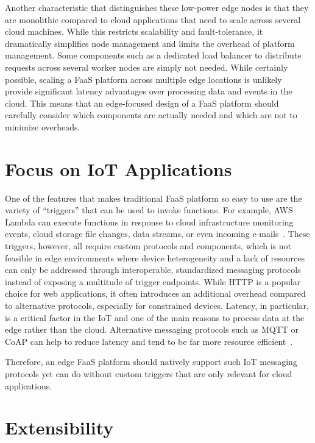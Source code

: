 Another characteristic that distinguishes these low-power edge nodes is that they are monolithic compared to cloud applications that need to scale across several cloud machines.
While this restricts scalability and fault-tolerance, it dramatically simplifies node management and limits the overhead of platform management.
Some components such as a dedicated load balancer to distribute requests across several worker nodes are simply not needed.
While certainly possible, scaling a FaaS platform across multiple edge locations is unlikely provide significant latency advantages over processing data and events in the cloud.
This means that an edge-focused design of a FaaS platform should carefully consider which components are actually needed and which are not to minimize overheads.

\section{Focus on IoT Applications}
\label{sec:focus_on_iot}

One of the features that makes traditional FaaS platform so easy to use are the variety of ``triggers'' that can be used to invoke functions.
For example, AWS Lambda can execute functions in response to cloud infrastructure monitoring events, cloud storage file changes, data streams, or even incoming e-mails~\cite{Baldini2017-zf}.
These triggers, however, all require custom protocols and components, which is not feasible in edge environments where device heterogeneity and a lack of resources can only be addressed through interoperable, standardized messaging protocols instead of exposing a multitude of trigger endpoints.
While HTTP is a popular choice for web applications, it often introduces an additional overhead compared to alternative protocols, especially for constrained devices.
Latency, in particular, is a critical factor in the IoT and one of the main reasons to process data at the edge rather than the cloud.
Alternative messaging protocols such as MQTT or CoAP can help to reduce latency and tend to be far more resource efficient~\cite{Laaroussi2018-fk,Naik2017-cn}.

Therefore, an edge FaaS platform should natively support such IoT messaging protocols yet can do without custom triggers that are only relevant for cloud applications.

\section{Extensibility}
\label{sec:extensibility}


